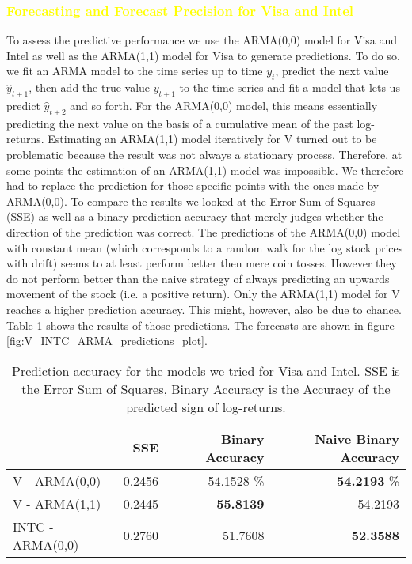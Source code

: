 \subsubsection{\textcolor{yellow}{Forecasting and Forecast Precision for Visa and Intel}}
To assess the predictive performance we use the ARMA(0,0) model for Visa and Intel as well as the ARMA(1,1) model for Visa to generate predictions. To do so, we fit an ARMA model to the time series up to time $y_t$, predict the next value $\hat{y}_{t+1}$, then add the true value $y_{t+1}$ to the time series and fit a model that lets us predict $\hat{y}_{t + 2}$ and so forth. For the ARMA(0,0) model, this means essentially predicting the next value on the basis of a cumulative mean of the past log-returns. Estimating an ARMA(1,1) model iteratively for V turned out to be problematic because the result was not always a stationary process. Therefore, at some points the estimation of an ARMA(1,1) model was impossible. We therefore had to replace the prediction for those specific points with the ones made by ARMA(0,0). 
To compare the results we looked at the Error Sum of Squares (SSE) as well as a binary prediction accuracy that merely judges whether the direction of the prediction was correct. The predictions of the ARMA(0,0) model with constant mean (which corresponds to a random walk for the log stock prices with drift) seems to at least perform better then mere coin tosses. However they do not perform better than the naive strategy of always predicting an upwards movement of the stock (i.e. a positive return). Only the ARMA(1,1) model for V reaches a higher prediction accuracy. This might, however, also be due to chance. Table \ref{tab:V_INTC_ARMA_predictions} shows the results of those predictions. The forecasts are shown in figure \ref{fig:V_INTC_ARMA_predictions_plot}. 
\begin{table}[]
    \centering
    \small
    \begin{tabular}{lrrr}
    \toprule
    {}  & SSE & Binary Accuracy & Naive Binary Accuracy \\
    \midrule
    V - ARMA(0,0) & 0.2456 & 54.1528 \% & \textbf{54.2193} \% \\
    V - ARMA(1,1) & 0.2445 & \textbf{55.8139} & 54.2193 \\
    INTC - ARMA(0,0) & 0.2760 & 51.7608 & \textbf{52.3588} \\
    \bottomrule
    \end{tabular}
    \caption{Prediction accuracy for the models we tried for Visa and Intel. SSE is the Error Sum of Squares, Binary Accuracy is the Accuracy of the predicted sign of log-returns.}
    \label{tab:V_INTC_ARMA_predictions}
\end{table}{}
